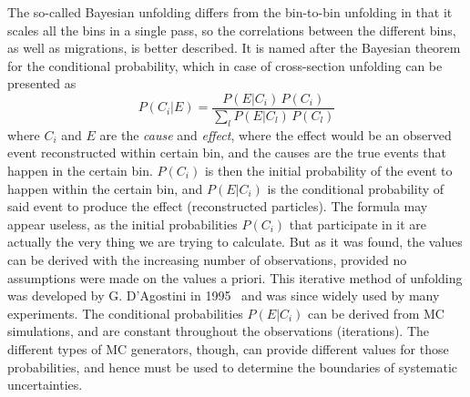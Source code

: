 The so-called Bayesian unfolding differs from the bin-to-bin unfolding in that it scales all the bins in a single pass, so the correlations between the different bins, as well as migrations, is better described. It is named after the Bayesian theorem for the conditional probability, which in case of cross-section unfolding can be presented as
\begin{equation}
P(C_i|E) = \frac{P(E|C_i) \, P(C_i)}{\sum\limits_l P(E|C_l) \, P(C_l)}
\end{equation}
where $C_i$ and $E$ are the {\itshape cause} and {\itshape effect}, where the effect would be an observed event reconstructed within certain bin, and the causes are the true events that happen in the certain bin. $P(C_i)$ is then the initial probability of the event to happen within the certain bin, and $P(E|C_i)$ is the conditional probability of said event to produce the effect (reconstructed particles). The formula may appear useless, as the initial probabilities $P(C_i)$ that participate in it are actually the very thing we are trying to calculate. But as it was found, the values can be derived with the increasing number of observations, provided no assumptions were made on the values a priori. This iterative method of unfolding was developed by G. D'Agostini in 1995~\cite{lib:zcs_bayes} and was since widely used by many experiments. The conditional probabilities $P(E|C_i)$ can be derived from MC simulations, and are constant throughout the observations (iterations). The different types of MC generators, though, can provide different values for those probabilities, and hence must be used to determine the boundaries of systematic uncertainties.

